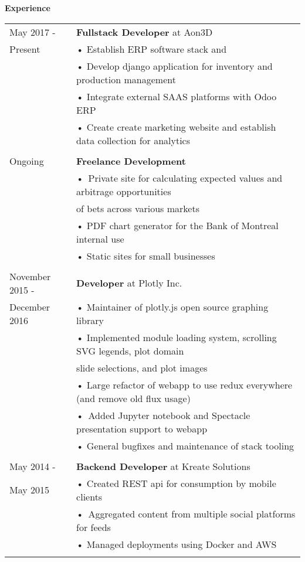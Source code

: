 \documentclass[10pt,notitlepage,oneside,draft]{article}
\begin{document}
\begin{flushleft}
  \large
  \textbf{Experience} \\
  \vspace{12pt}
  \normalsize
  \begin{tabular}{ p{86pt} | l}
    May 2017 - & \textbf{Fullstack Developer} at Aon3D \\
    Present & • Establish ERP software stack and \\
    & • Develop django application for inventory and production management \\
    & • Integrate external SAAS platforms with Odoo ERP \\
    & • Create create marketing website and establish data collection for analytics \\
    & \\ 
    Ongoing & \textbf{Freelance Development} \\
    & • Private site for calculating expected values and arbitrage opportunities \\
    & \hspace{5pt} of bets across various markets \\
    & • PDF chart generator for the Bank of Montreal internal use \\
    & • Static sites for small businesses \\
    & \\
    November 2015 - & \textbf{Developer} at Plotly Inc. \\
    December 2016 & • Maintainer of plotly.js open source graphing library \\
    & • Implemented module loading system, scrolling SVG legends, plot domain \\
    & \hspace{5pt} slide selections, and plot images \\
    & • Large refactor of webapp to use redux everywhere (and remove old flux usage) \\
    & • Added Jupyter notebook and Spectacle presentation support to webapp \\
    & • General bugfixes and maintenance of stack tooling \\
    & \\
    May 2014 - & \textbf{Backend Developer} at Kreate Solutions \\
    May 2015 & • Created REST api for consumption by mobile clients \\
    & • Aggregated content from multiple social platforms for feeds \\
    & • Managed deployments using Docker and AWS \\
    & \\
  \end{tabular}
  \vspace{20pt}



\end{flushleft}
\end{document}
